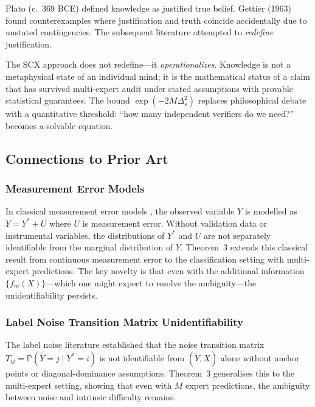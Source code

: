 \begin{remark}
Plato (c.\ 369 BCE) defined knowledge as justified true belief.
Gettier (1963) found counterexamples where justification and truth
coincide accidentally due to unstated contingencies. The subsequent
literature attempted to \textit{redefine} justification.

The SCX approach does not redefine---it \textit{operationalizes}.
Knowledge is not a metaphysical state of an individual mind; it is
the mathematical status of a claim that has survived multi-expert
audit under stated assumptions with provable statistical guarantees.
The bound $\exp(-2M\Delta_s^2)$ replaces philosophical debate with
a quantitative threshold: ``how many independent verifiers do we
need?'' becomes a solvable equation.
\end{remark}

\subsection{Connections to Prior Art}
\label{sec:thm3_prior}

\subsubsection{Measurement Error Models}

In classical measurement error models
\cite{fuller1987measurement,carroll2006measurement}, the observed variable
$Y$ is modelled as $Y=Y^*+U$ where $U$ is measurement error.  Without
validation data or instrumental variables, the distributions of $Y^*$ and
$U$ are not separately identifiable from the marginal distribution of $Y$.
Theorem~3 extends this classical result from continuous measurement error to
the classification setting with multi-expert predictions.  The key novelty is
that even with the additional information $\{f_m(X)\}$---which one might
expect to resolve the ambiguity---the unidentifiability persists.

\subsubsection{Label Noise Transition Matrix Unidentifiability}

The label noise literature \cite{menon2015learning,patrini2017making}
established that the noise transition matrix $T_{ij}=\mathbb{P}(\tilde Y=j\mid
Y^*=i)$ is not identifiable from $(\tilde Y,X)$ alone without anchor points or
diagonal-dominance assumptions.  Theorem~3 generalises this to the multi-expert
setting, showing that even with $M$ expert predictions, the ambiguity between
noise and intrinsic difficulty remains.

